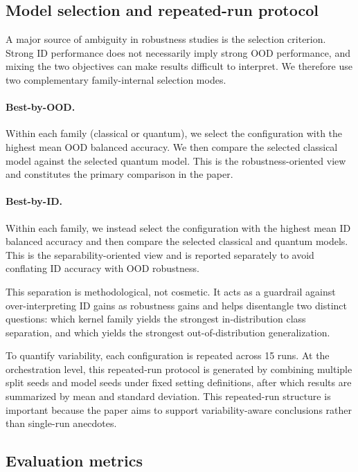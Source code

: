 \documentclass[pdflatex,sn-mathphys-num]{sn-jnl}%
\theoremstyle{thmstyleone}%
\theoremstyle{thmstyletwo}%
\theoremstyle{thmstylethree}%
\begin{document}
\subsection{Model selection and repeated-run protocol}

A major source of ambiguity in robustness studies is the selection criterion. Strong ID performance does not necessarily imply strong OOD performance, and mixing the two objectives can make results difficult to interpret. We therefore use two complementary family-internal selection modes.

\paragraph{Best-by-OOD.}
Within each family (classical or quantum), we select the configuration with the highest mean OOD balanced accuracy. We then compare the selected classical model against the selected quantum model. This is the robustness-oriented view and constitutes the primary comparison in the paper.

\paragraph{Best-by-ID.}
Within each family, we instead select the configuration with the highest mean ID balanced accuracy and then compare the selected classical and quantum models. This is the separability-oriented view and is reported separately to avoid conflating ID accuracy with OOD robustness.

This separation is methodological, not cosmetic. It acts as a guardrail against over-interpreting ID gains as robustness gains and helps disentangle two distinct questions: which kernel family yields the strongest in-distribution class separation, and which yields the strongest out-of-distribution generalization.

To quantify variability, each configuration is repeated across 15 runs. At the orchestration level, this repeated-run protocol is generated by combining multiple split seeds and model seeds under fixed setting definitions, after which results are summarized by mean and standard deviation. This repeated-run structure is important because the paper aims to support variability-aware conclusions rather than single-run anecdotes.

\subsection{Evaluation metrics}
\end{document}

